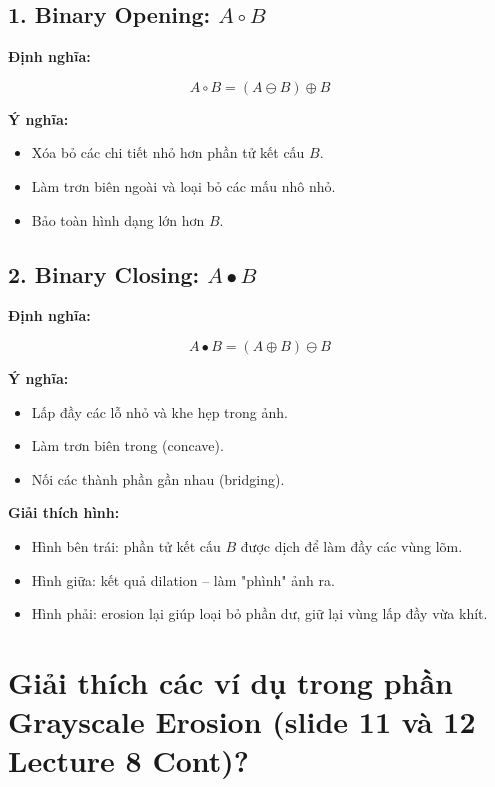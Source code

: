 \documentclass[12pt]{article}
\begin{document}
	 \subsection*{1. Binary Opening: \texorpdfstring{$A \circ B$}{}}
	 
	 \textbf{Định nghĩa:}
	 
	 \[
	 A \circ B = (A \ominus B) \oplus B
	 \]
	 
	 \textbf{Ý nghĩa:}
	 \begin{itemize}
	 	\item Xóa bỏ các chi tiết nhỏ hơn phần tử kết cấu \( B \).
	 	\item Làm trơn biên ngoài và loại bỏ các mấu nhô nhỏ.
	 	\item Bảo toàn hình dạng lớn hơn \( B \).
	 \end{itemize}
	 
	 \vspace{1cm}
	 \subsection*{2. Binary Closing: \texorpdfstring{$A \bullet B$}{}}
	 
	 \textbf{Định nghĩa:}
	 
	 \[
	 A \bullet B = (A \oplus B) \ominus B
	 \]
	 
	 \textbf{Ý nghĩa:}
	 \begin{itemize}
	 	\item Lấp đầy các lỗ nhỏ và khe hẹp trong ảnh.
	 	\item Làm trơn biên trong (concave).
	 	\item Nối các thành phần gần nhau (bridging).
	 \end{itemize}
	 
	 \textbf{Giải thích hình:}
	 
	 
	 \begin{itemize}
	 	\item Hình bên trái: phần tử kết cấu \( B \) được dịch để làm đầy các vùng lõm.
	 	\item Hình giữa: kết quả dilation – làm "phình" ảnh ra.
	 	\item Hình phải: erosion lại giúp loại bỏ phần dư, giữ lại vùng lấp đầy vừa khít.
	 \end{itemize}
	 
	 \section{Giải thích các ví dụ trong phần Grayscale Erosion (slide 11 và 12 Lecture 8 Cont)?}
	 
\end{document}
